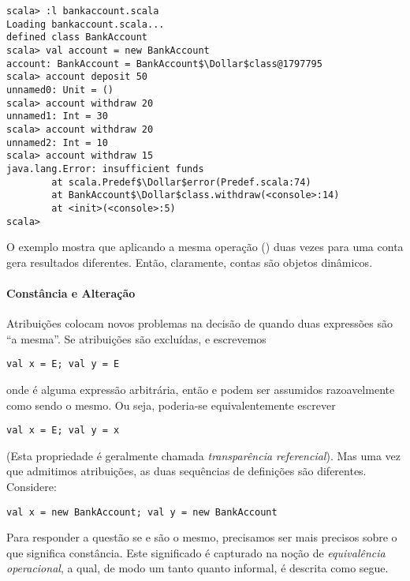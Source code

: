 \begin{lstlisting}
scala> :l bankaccount.scala
Loading bankaccount.scala...
defined class BankAccount
scala> val account = new BankAccount
account: BankAccount = BankAccount$\Dollar$class@1797795
scala> account deposit 50
unnamed0: Unit = ()
scala> account withdraw 20
unnamed1: Int = 30
scala> account withdraw 20
unnamed2: Int = 10
scala> account withdraw 15
java.lang.Error: insufficient funds
        at scala.Predef$\Dollar$error(Predef.scala:74)
        at BankAccount$\Dollar$class.withdraw(<console>:14)
        at <init>(<console>:5)
scala> 
\end{lstlisting}
O exemplo mostra que aplicando a mesma operação () duas vezes para uma conta gera resultados
diferentes. Então, claramente, contas são objetos dinâmicos.
\paragraph{Constância e Alteração}
Atribuições colocam novos problemas na decisão de quando duas expressões são ``a mesma''.
Se atribuições são excluídas, e escrevemos
\begin{lstlisting}
val x = E; val y = E
\end{lstlisting}
onde  é alguma expressão arbitrária, então  e 
podem ser assumidos razoavelmente como sendo o mesmo.
Ou seja, poderia-se equivalentemente escrever
\begin{lstlisting}
val x = E; val y = x
\end{lstlisting}
(Esta propriedade é geralmente chamada {\em transparência referencial}). Mas uma vez que admitimos atribuições, 
as duas sequências de definições são diferentes. Considere: 
\begin{lstlisting}
val x = new BankAccount; val y = new BankAccount
\end{lstlisting}
Para responder a questão se  e  são o mesmo, precisamos ser mais precisos sobre o que significa
constância. Este significado é capturado na noção de {\em equivalência operacional}, a qual, de modo um tanto 
quanto informal, é descrita como segue.

